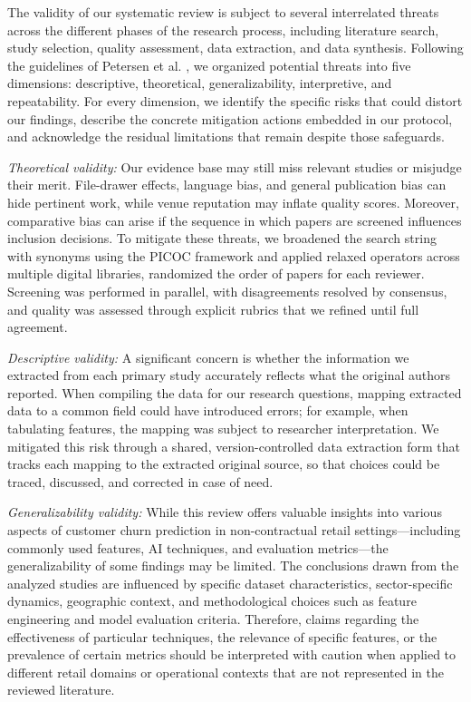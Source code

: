 The validity of our systematic review is subject to several interrelated threats across the different phases of the research process, including literature search, study selection, quality assessment, data extraction, and data synthesis. Following the guidelines of Petersen et al. \cite{PETERSEN20151}, we organized potential threats into five dimensions: descriptive, theoretical, generalizability, interpretive, and repeatability. 
For every dimension, we identify the specific risks that could distort our findings, describe the concrete mitigation actions embedded in our protocol, and acknowledge the residual limitations that remain despite those safeguards.

\textit{Theoretical validity: } Our evidence base may still miss relevant studies or misjudge their merit. File-drawer effects, language bias, and general publication bias can hide pertinent work, while venue reputation may inflate quality scores. Moreover, comparative bias can arise if the sequence in which papers are screened influences inclusion decisions. To mitigate these threats, we broadened the search string with synonyms using the PICOC framework and applied relaxed operators across multiple digital libraries, randomized the order of papers for each reviewer. Screening was performed in parallel, with disagreements resolved by consensus, and quality was assessed through explicit rubrics that we refined until full agreement.

\textit{Descriptive validity: }A significant concern is whether the information we extracted from each primary study accurately reflects what the original authors reported. When compiling the data for our research questions, mapping extracted data to a common field could have introduced errors; for example, when tabulating features, the mapping was subject to researcher interpretation. We mitigated this risk through a shared, version-controlled data extraction form that tracks each mapping to the extracted original source, so that choices could be traced, discussed, and corrected in case of need.

\textit{Generalizability validity: } While this review offers valuable insights into various aspects of customer churn prediction in non-contractual retail settings---including commonly used features, AI techniques, and evaluation metrics---the generalizability of some findings may be limited. The conclusions drawn from the analyzed studies are influenced by specific dataset characteristics, sector-specific dynamics, geographic context, and methodological choices such as feature engineering and model evaluation criteria. Therefore, claims regarding the effectiveness of particular techniques, the relevance of specific features, or the prevalence of certain metrics should be interpreted with caution when applied to different retail domains or operational contexts that are not represented in the reviewed literature.

